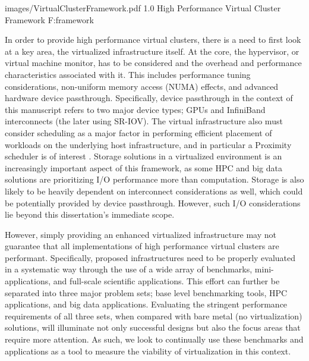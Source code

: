   {images/VirtualClusterFramework.pdf}
  {1.0}
  {High Performance Virtual Cluster Framework}
  {F:framework}

In order to provide high performance virtual clusters, there is a need to first look at a key area, the virtualized infrastructure itself. At the core, the hypervisor, or virtual machine monitor, has to be considered and the overhead and performance characteristics associated with it. This includes performance tuning considerations, non-uniform memory access (NUMA) effects, and advanced hardware device passthrough. Specifically, device passthrough in the context of this manuscript refers to two major device types; GPUs and InfiniBand interconnects (the later using SR-IOV). The virtual infrastructure also must consider scheduling as a major factor in performing efficient placement of workloads on the underlying host infrastructure, and in particular a Proximity scheduler is of interest \cite{www-proximity-scheduler}. Storage solutions in a virtualized environment is an increasingly important aspect of this framework, as some HPC and big data solutions are prioritizing I/O performance more than computation. Storage is also likely to be heavily dependent on interconnect considerations as well, which could be potentially provided by device passthrough. However, such I/O considerations lie beyond this dissertation's immediate scope.  


However, simply providing an enhanced virtualized infrastructure may not guarantee that all implementations of high performance virtual clusters are performant. Specifically, proposed infrastructures need to be properly evaluated in a systematic way through the use of a wide array of benchmarks, mini-applications, and full-scale scientific applications. This effort can further be separated into three major problem sets; base level benchmarking tools, HPC applications, and big data applications. Evaluating the stringent performance requirements of all three sets, when compared with bare metal (no virtualization) solutions, will illuminate not only successful designs but also the focus areas that require more attention.  As such, we look to continually use these benchmarks and applications as a tool to measure the viability of virtualization in this context. 

